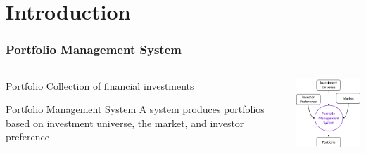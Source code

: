 \section{Introduction}
\begin{frame}
\frametitle{Portfolio Management System}
\begin{columns}
\begin{column}{0.55\textwidth}
\begin{block}{Portfolio}
Collection of financial investments
\end{block}
\begin{block}{Portfolio Management System}
A system produces portfolios based on investment universe, the market, and investor preference
\end{block}
\end{column}
\begin{column}{0.45\textwidth}
\begin{center}
\includegraphics[width=4.8cm]{images/portfolio_management_system.png}
\end{center}
\end{column}
\end{columns}
\end{frame}







